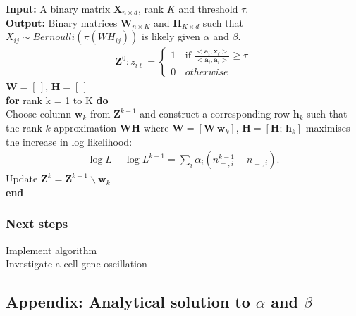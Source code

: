 \documentclass[12pt]{article}
\begin{document}
{\bf Input:} A binary matrix $\mathbf{X}_{n \times d}$, rank $K$ and threshold $\tau$. \\
{\bf Output:} Binary matrices $\mathbf{W}_{n \times K}$ and $\mathbf{H}_{K \times d}$  such that $X_{ij} \sim Bernoulli (\pi(WH_{ij}))$ is likely given $\alpha$ and $\beta$. \\
\begin{align*}
  \mathbf{Z}^{0}:  z_{i\ell} =
   \begin{cases}
      1 & \text{if }  \frac{<\mathbf{a}_i,\mathbf{x}_{\ell}>}{<\mathbf{a}_{i},\mathbf{a}_{i}>} \geq \tau \\
      0 \, &otherwise
    \end{cases}
\end{align*}
$\mathbf{W} = [\, ]$,  $\mathbf{H} = [\, ]$ \\
{\bf for} rank k = 1 to K {\bf do} \\
\indent Choose column $\mathbf{w}_{k}$ from $\mathbf{Z}^{k-1}$ and construct a corresponding row $\mathbf{h}_{k}$ such that the rank $k$ approximation $\mathbf{WH}$ where  $\mathbf{W} = [\mathbf{W}\, \mathbf{w}_{k}]$,  $\mathbf{H} = [\mathbf{H} ;\, \mathbf{h}_{k}]$ maximises the increase in log likelihood:
  \begin{align*}
   \log L - \log L^{k-1} = \sum_{i} \alpha_i ( n^{k-1}_{=,i} - n_{=,i}).
\end{align*}
\indent Update $\mathbf{Z}^k = \mathbf{Z}^{k-1} \backslash \mathbf{w}_{k}$ \\
{\bf end}

\subsubsection*{Next steps} %

Implement algorithm \\ 
Investigate a cell-gene oscillation



\subsection*{Appendix: Analytical solution to $\alpha$ and $\beta$} %
\end{document}
